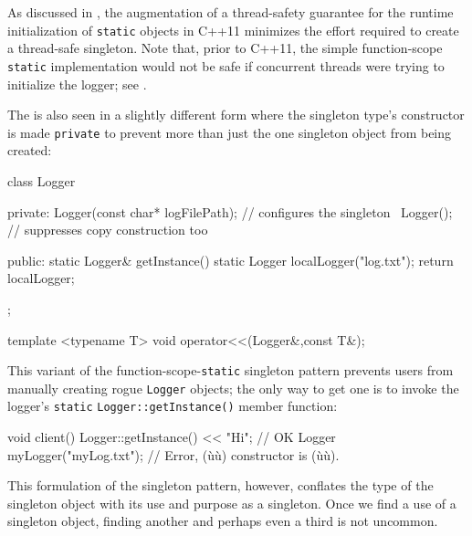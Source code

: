 As discussed in , the augmentation of a
thread-safety guarantee for the runtime initialization of
 \lstinline!static! objects in C++11 minimizes the
effort required to create a thread-safe singleton.  Note that, prior to C++11,
the simple function-scope \lstinline!static!
implementation would not be safe if concurrent threads were trying to
initialize the logger; see .

The  is also seen in a slightly different form
where the singleton type's constructor is made \lstinline!private! to
prevent more than just the one singleton object from being created:

\begin{emcppslisting}[emcppsbatch=e10]
class Logger
{
private:
    Logger(const char* logFilePath);  // configures the singleton
    ~Logger();                        // suppresses copy construction too

public:
    static Logger& getInstance()
    {
        static Logger localLogger("log.txt");
        return localLogger;
    }
};
\end{emcppslisting}
\begin{emcppshiddenlisting}[emcppsbatch=e10]
template <typename T>
void operator<<(Logger&,const T&);
\end{emcppshiddenlisting}

\noindent This variant of the function-scope-\lstinline!static! singleton pattern
prevents users from manually creating rogue \lstinline!Logger! objects; the
only way to get one is to invoke the logger's \lstinline!static!
\lstinline!Logger::getInstance()! member function:

\begin{emcppslisting}[emcppsbatch=e10]
void client()
{
    Logger::getInstance() << "Hi";  // OK
    Logger myLogger("myLog.txt");   // Error, (ù{}ù) constructor is (ù{}ù).
}
\end{emcppslisting}

\noindent This formulation of the singleton pattern, however, conflates the type
of the singleton object with its use and purpose as a singleton. Once we
find a use of a singleton object, finding another and perhaps even a
third is not uncommon.

